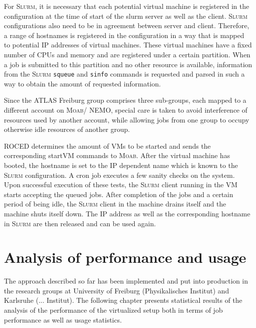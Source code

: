 For \textsc{Slurm}, it is necessary that each potential virtual
machine is registered in the configuration at the time of start of the
slurm server as well as the client. \textsc{Slurm} configurations also
need to be in agreement between server and client.
Therefore, a range of hostnames is registered in the configuration in
a way that is mapped to potential IP addresses of virtual machines.
These virtual machines have a fixed number of CPUs and memory and are
registered under a certain partition.
When a job is submitted to this partition and no other resource is
available, information from the \textsc{Slurm} \texttt{squeue} and
\texttt{sinfo} commands is requested and parsed in such a way to
obtain the amount of requested information.

Since the ATLAS Freiburg group comprises three sub-groups, each mapped
to a different account on \textsc{Moab}/ NEMO, special care is taken to
avoid interference of resources used by another account, while
allowing jobs from one group to occupy otherwise idle resources of another group.


ROCED determines the amount of VMs to be started and sends the
corresponding startVM commands to \textsc{Moab}.
After the virtual machine has booted, the hostname is set to the IP
dependent name which is known to the \textsc{Slurm} configuration.
A cron job executes a few sanity
checks on the system.
Upon successful execution of these tests, the \textsc{Slurm} client
running in the VM starts accepting the queued jobs.
After completion of the jobs and a certain period of being idle, the
\textsc{Slurm} client in the machine drains itself and the machine
shuts itself down.
The IP address as well as the corresponding hostname in \textsc{Slurm}
are then released and can be used again.








\section{Analysis of performance and usage}

The approach described so far has been implemented and put into
production in the research groups at University of Freiburg
(Physikalisches Institut) and Karlsruhe (... Institut).
The following chapter presents statistical results of the analysis of
the performance of the virtualized setup both in terms of job
performance as well as usage statistics.


